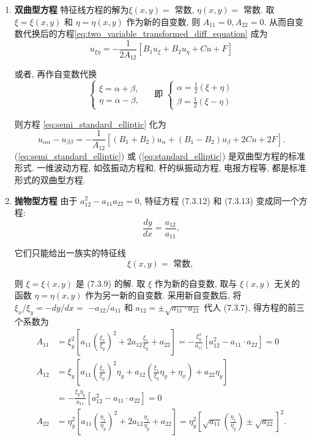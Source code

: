 \begin{enumerate}
    \item \textbf{双曲型方程}
特征线方程的解为$\xi(x, y)=$ 常数, $\eta(x, y)=$ 常数.
取 $\xi=\xi(x, y)$ 和 $\eta=\eta(x, y)$ 作为新的自变数, 则 $A_{11}=0, A_{22}=0$. 从而自变数代换后的方程\ref{eq:two_variable_transformed_diff_equation} 成为
\begin{equation}
    u_{\xi \eta}=-\frac{1}{2 A_{12}}\left[B_1 u_{\xi}+B_2 u_\eta+C u+F\right]
    \label{eq:semi_standard_elliptic}
\end{equation}

或者, 再作自变数代换
$$
\left\{\begin{array} { l } 
{ \xi = \alpha + \beta , } \\
{ \eta = \alpha - \beta , }
\end{array} \quad \text { 即 } \left\{\begin{array}{l}
\alpha=\frac{1}{2}(\xi+\eta) \\
\beta=\frac{1}{2}(\xi-\eta)
\end{array}\right.\right.
$$

则方程 \ref{eq:semi_standard_elliptic} 化为
\begin{equation}
    u_{\alpha \alpha}-u_{\beta \beta}=-\frac{1}{A_{12}}\left[\left(B_1+B_2\right) u_\alpha+\left(B_1-B_2\right) u_\beta+2 C u+2 F\right] .
    \label{eq:standard_elliptic}
\end{equation}
(\ref{eq:semi_standard_elliptic}) 或 (\ref{eq:standard_elliptic}) 是双曲型方程的标准形式. 
一维波动方程, 如弦振动方程和, 杆的纵振动方程, 电报方程等, 都是标准形式的双曲型方程.


\item \textbf{抛物型方程}
由于 $a_{12}^2-a_{11} a_{22}=0$, 特征方程 (7.3.12) 和 (7.3.13) 变成同一个方程:
$$
\frac{d y}{d x}=\frac{a_{12}}{a_{11}},
$$

它们只能给出一族实的特征线
$$
\xi(x, y)=\text { 常数, }
$$

则 $\xi=\xi(x, y)$ 是 (7.3.9) 的解. 取 $\xi$ 作为新的自变数, 取与 $\xi(x, y)$ 无关的函数 $\eta=\eta(x, y)$ 作为另一新的自变数. 采用新自变数后, 将 $\xi_x / \xi_y=-d y / d x=$ $-a_{12} / a_{11}$ 和 $a_{12}= \pm \sqrt{a_{11} \cdot a_{22}}$ 代人 (7.3.7), 得方程的前三个系数为
$$
\begin{aligned}
A_{11} & =\xi_y^2\left[a_{11}\left(\frac{\xi_x}{\xi_y}\right)^2+2 a_{12} \frac{\xi_x}{\xi_y}+a_{22}\right]=-\frac{\xi_y^2}{a_{11}}\left[a_{12}^2-a_{11} \cdot a_{22}\right]=0 \\
A_{12} & =\xi_y\left[a_{11}\left(\frac{\xi_x}{\xi_y}\right)^2 \eta_y+a_{12}\left(\frac{\xi_x}{\xi_y} \eta_y+\eta_x\right)+a_{22} \eta_y\right] \\
& =-\frac{\xi_y \eta_y}{a_{11}}\left[a_{12}^2-a_{11} \cdot a_{22}\right]=0 \\
A_{22} & =\eta_y^2\left[a_{11}\left(\frac{\eta_x}{\eta_y}\right)^2+2 a_{12} \frac{\eta_x}{\eta_y}+a_{22}\right]=\eta_y^2\left[\sqrt{a_{11}}\left(\frac{\eta_x}{\eta_y}\right) \pm \sqrt{a_{22}}\right]^2 .
\end{aligned}
$$


\end{enumerate}
